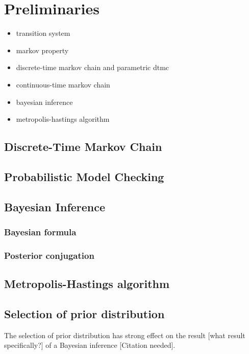 \chapter{Preliminaries}
{\color{red}
  \begin{itemize}
  \item transition system
  \item markov property
  \item discrete-time markov chain and parametric dtmc
  \item continuous-time markov chain
  \item bayesian inference
  \item metropolis-hastings algorithm
  \end{itemize}
}

\section{Discrete-Time Markov Chain}


\section{Probabilistic Model Checking}






\section{Bayesian Inference}

\subsection{Bayesian formula}



\subsection{Posterior conjugation}


\section{Metropolis-Hastings algorithm}

\section{Selection of prior distribution}
The selection of prior distribution has strong effect on the result [what result
specifically?] of a Bayesian inference {\color{Red}[Citation needed]}.